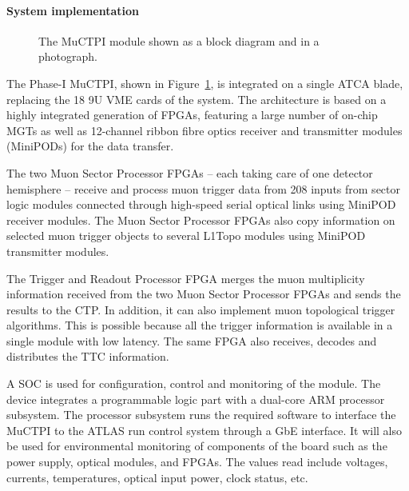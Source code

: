 \documentclass[cernpreprint, atlasdraft=false, UKenglish,british,orcidlogo, texmf, orcidlogo]{atlasdoc}
\begin{document}
 
\paragraph{System implementation}
 
\begin{figure}[htbp!]
\centering
{}
\caption{The \gls{MuCTPI} module shown \protect{} as a block diagram and \protect{} in a photograph.}
\label{fig:TDAQMUCTPI}
\end{figure}
 
The Phase-I \gls{MuCTPI}, shown in Figure~\ref{fig:TDAQMUCTPI}, is integrated on a single \gls{ATCA} blade, replacing the 18 9U \gls{VME} cards of the \RunTwo system.  The architecture is based on a highly integrated generation of \glspl{FPGA}, featuring a large number of on-chip \glspl{MGT} as well as 12-channel ribbon fibre optics receiver and transmitter modules (MiniPODs) for the data transfer.
 
The two Muon Sector Processor \glspl{FPGA} -- each taking care of one detector hemisphere -- receive and process muon trigger data from 208 inputs from sector logic modules connected through high-speed serial optical links using MiniPOD receiver modules.  The Muon Sector Processor \glspl{FPGA} also copy information on selected muon trigger objects to several \gls{L1Topo} modules using MiniPOD transmitter modules.
 
The Trigger and Readout Processor \gls{FPGA} merges the muon multiplicity information received from the two Muon Sector Processor \glspl{FPGA} and sends the results to the \gls{CTP}.  In addition, it can also implement muon topological trigger algorithms.  This is possible because all the trigger information is available in a single module with low latency.  The same \gls{FPGA} also receives, decodes and distributes the \gls{TTC} information.
 
A \gls{SOC} is used for configuration, control and monitoring of the module.  The device integrates a programmable logic part with a dual-core \gls{ARM} processor subsystem.  The processor subsystem runs the required software to interface the \gls{MuCTPI} to the ATLAS run control system through a \gls{GbE} interface.  It will also be used for environmental monitoring of components of the board such as the power supply, optical modules, and \glspl{FPGA}.  The values read include voltages, currents, temperatures, optical input power, clock status, etc.
 
\end{document}
